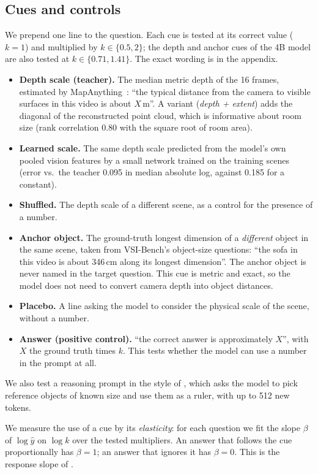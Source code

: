 \documentclass[letterpaper]{article} %
\begin{document}
\subsection{Cues and controls}
We prepend one line to the question. Each cue is tested at its correct value ($k=1$) and multiplied by $k \in \{0.5, 2\}$; the depth and anchor cues of the 4B model are also tested at $k \in \{0.71, 1.41\}$. The exact wording is in the appendix.
\begin{itemize}
\item \textbf{Depth scale (teacher).} The median metric depth of the 16 frames, estimated by MapAnything~\citep{keetha2025mapanything}: ``the typical distance from the camera to visible surfaces in this video is about $X$\,m''. A variant (\emph{depth + extent}) adds the diagonal of the reconstructed point cloud, which is informative about room size (rank correlation 0.80 with the square root of room area).
\item \textbf{Learned scale.} The same depth scale predicted from the model's own pooled vision features by a small network trained on the training scenes (error vs.\ the teacher 0.095 in median absolute log, against 0.185 for a constant).
\item \textbf{Shuffled.} The depth scale of a different scene, as a control for the presence of a number.
\item \textbf{Anchor object.} The ground-truth longest dimension of a \emph{different} object in the same scene, taken from VSI-Bench's object-size questions: ``the sofa in this video is about 346\,cm along its longest dimension''. The anchor object is never named in the target question. This cue is metric and exact, so the model does not need to convert camera depth into object distances.
\item \textbf{Placebo.} A line asking the model to consider the physical scale of the scene, without a number.
\item \textbf{Answer (positive control).} ``the correct answer is approximately $X$'', with $X$ the ground truth times $k$. This tests whether the model can use a number in the prompt at all.
\end{itemize}
We also test a reasoning prompt in the style of \citet{liao2024reasoning}, which asks the model to pick reference objects of known size and use them as a ruler, with up to 512 new tokens.

We measure the use of a cue by its \emph{elasticity}: for each question we fit the slope $\beta$ of $\log \hat y$ on $\log k$ over the tested multipliers. An answer that follows the cue proportionally has $\beta = 1$; an answer that ignores it has $\beta = 0$. This is the response slope of \citet{tan2026scale}.
\end{document}
